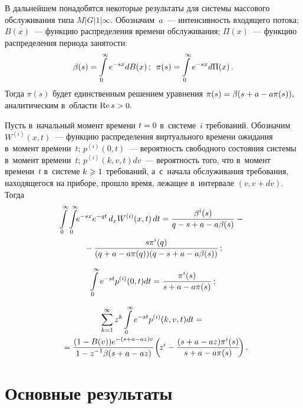 \begin{multicols}{2}
В дальнейшем понадобятся некоторые результаты для системы 
массового обслуживания типа $M|G|1|\infty.$
Обозначим~$a$~--- интенсивность входящего потока; $B(x)$~--- 
функцию распределения времени обслуживания; 
$\Pi(x)$~--- функцию распределения периода занятости:
$$
\beta(s)=\int\limits_0^{\infty}e^{-sx}dB(x)\,;\enskip 
\pi(s)=\int\limits_0^{\infty}e^{-sx}d\Pi(x)\,.
$$
Тогда $\pi(s)$ будет единственным решением уравнения 
$\pi(s)\hm=\beta(s\hm+a\hm-a\pi(s)),$ аналитическим в~области $\mathrm{Re}\, s\hm>0.$

Пусть в~начальный момент времени $t\hm=0$  в~сис\-те\-ме~$i$ требований. 
Обозначим $W^{(i)}(x,t)$~--- функцию распределения виртуального 
времени ожидания в~момент времени~$t$; $p^{(i)}(0,t)$~--- вероятность 
свободного состояния системы в~момент времени~$t$; $p^{(i)}(k,v,t)dv$~--- 
вероятность того, что в~момент времени~$t$ в~системе 
$k\hm\geqslant 1$ требований, а~с~начала обслуживания требования, 
находящегося на приборе, прошло время, лежащее в~интервале $(v,v+dv).$
Тогда
\begin{multline}
\label{n1}
\hspace*{-1.80583pt}\int\limits_0^{\infty}\int\limits_0^{\infty}\!\!e^{-sx}e^{-qt}\,d_xW^{(i)}
(x,t)\,dt=\displaystyle\frac{\displaystyle \beta^i(s)\mathstrut}{\displaystyle q-s+a-a\beta(s)\mathstrut}-{}\\
{}-
\displaystyle\frac{\displaystyle s\pi^i(q)\mathstrut}{\displaystyle (q+a-a\pi(q))(q-s+a-a\beta(s))\mathstrut}\,;
\end{multline}


\noindent
\begin{equation*}
\int\limits_0^{\infty}e^{-st}p^{(i)}(0,t)dt=\displaystyle\frac{\displaystyle \pi^i(s)\mathstrut}{\displaystyle s+a-a\pi(s)\mathstrut}\,;
\end{equation*}

\vspace*{-18pt}

\noindent
\begin{multline*}
\sum\limits_{k=1}^{\infty}z^k\int\limits_0^{\infty}
e^{-st}p^{(i)}(k,v,t)dt={}\\[-2pt]
{}=\displaystyle\frac{\displaystyle (1-B(v))e^{-(s+a-az)v}\mathstrut}{\displaystyle 1-z^{-1}\beta(s+a-az)\mathstrut}
\!\left(\!z^i-\displaystyle\frac{\displaystyle (s+a-az)\pi^i(s)\mathstrut}{\displaystyle s+a-a\pi(s)\mathstrut}\!\right).\hspace*{-4.77934pt}
\end{multline*}

\vspace*{-15pt}


\section{Основные результаты}


\end{multicols}
